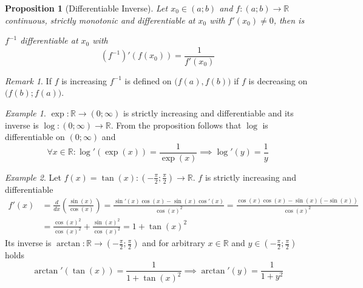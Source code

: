 \documentclass[english,titlepage]{uzhpub}
\theoremstyle{definition}
\theoremstyle{plain}
\newtheorem{proposition}[definition]{Proposition}
\theoremstyle{remark}
\newtheorem*{remark}{Remark}
\theoremstyle{example}
\newtheorem*{example}{Example}
\begin{document}
   \begin{proposition}[Differentiable Inverse]\label{pro:diff_inv}
      Let \(x_0 \in (a;b)\) and \(f: (a;b) \to \mathbb{R}\) continuous, strictly monotonic and differentiable at \(x_0\) with \(f'(x_0) \neq 0\), then is

      \(f^{-1}\) differentiable at \(x_0\) with
      \[(f^{-1})'(f(x_0)) = \frac{1}{f'(x_0)}\]
   \end{proposition}
   \begin{remark}
      If \(f\) is increasing \(f^{-1}\) is defined on \(\big(f(a), f(b)\big)\) if \(f\) is decreasing on \(\big(f(b); f(a)\big)\).
   \end{remark}
   \begin{example}
      \(\exp: \mathbb{R} \to (0; \infty)\) is strictly increasing and differentiable and its inverse is \(\log: (0; \infty) \to \mathbb{R}\).
      From the proposition follows that \(\log\) is differentiable on \((0; \infty)\) and
      \[\forall x \in \mathbb{R}: \log'(\exp(x)) = \frac{1}{\exp(x)} \implies \log'(y) = \frac{1}{y}\]
   \end{example}
   \begin{example}
      Let \(f(x) = \tan(x): \left(-\frac{\pi}{2}; \frac{\pi}{2}\right) \to \mathbb{R}\).
      \(f\) is strictly increasing and differentiable
      \begin{equation*}
         \begin{split}
            f'(x) & = \frac{d}{dx} \left(\frac{\sin(x)}{\cos(x)}\right) = \frac{\sin'(x)\cos(x) - \sin(x)\cos'(x)}{\cos(x)^2} = \frac{\cos(x)\cos(x) - \sin(x)(-\sin(x))}{\cos(x)^2}\\
                  & = \frac{\cos(x)^2}{\cos(x)^2} + \frac{\sin(x)^2}{\cos(x)^2} = 1 + \tan(x)^2
         \end{split}
      \end{equation*}
      Its inverse is \(\arctan: \mathbb{R} \to \left(-\frac{\pi}{2}; \frac{\pi}{2}\right)\) and for arbitrary \(x \in \mathbb{R}\) and \(y \in \left(-\frac{\pi}{2}; \frac{\pi}{2}\right)\) holds
      \[\arctan'(\tan(x)) = \frac{1}{1 + \tan(x)^2} \implies \arctan'(y) = \frac{1}{1 + y^2}\]
   \end{example}
\end{document}
